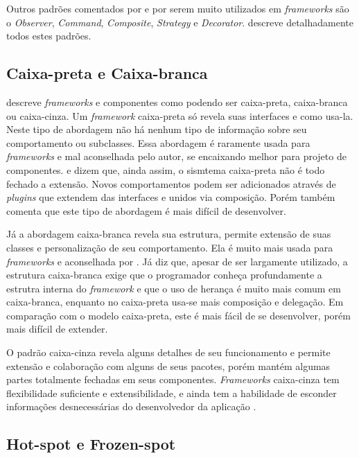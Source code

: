 Outros padrões comentados por \cite{Larman2005} e \cite{Szyperski2002} por serem muito utilizados em \textit{frameworks} são o \textit{Observer}, \textit{Command}, \textit{Composite}, \textit{Strategy} e \textit{Decorator}. \cite{Gamma1995} descreve detalhadamente todos estes padrões.

\subsection{Caixa-preta e Caixa-branca}

\cite{Szyperski2002} descreve \textit{frameworks} e componentes como podendo ser caixa-preta, caixa-branca ou caixa-cinza. Um \textit{framework} caixa-preta só revela suas interfaces e como usa-la. Neste tipo de abordagem não há nenhum tipo de informação sobre seu comportamento ou subclasses. Essa abordagem é raramente usada para \textit{frameworks} e mal aconselhada pelo autor, se encaixando melhor para projeto de componentes. \cite{Szyperski2002} e \cite{Fayad1999} dizem que, ainda assim, o sismtema caixa-preta não é todo fechado a extensão. Novos comportamentos podem ser adicionados através de \textit{plugins} que extendem das interfaces e unidos via composição. Porém \cite{Fayad1999} também comenta que este tipo de abordagem é mais difícil de desenvolver.

Já a abordagem caixa-branca revela sua estrutura, permite extensão de suas classes e personalização de seu comportamento. Ela é muito mais usada para \textit{frameworks} e aconselhada por \cite{Szyperski2002}. Já \cite{Fayad1999} diz que, apesar de ser largamente utilizado, a estrutura caixa-branca exige que o programador conheça profundamente a estrutra interna do \textit{framework} e que o uso de herança é muito mais comum em caixa-branca, enquanto no caixa-preta usa-se mais composição e delegação. Em comparação com o modelo caixa-preta, este é mais fácil de se desenvolver, porém mais difícil de extender.

O padrão caixa-cinza revela alguns detalhes de seu funcionamento e permite extensão e colaboração com alguns de seus pacotes, porém mantém algumas partes totalmente fechadas em seus componentes. \textit{Frameworks} caixa-cinza tem flexibilidade suficiente e extensibilidade, e ainda tem a habilidade de esconder informações desnecessárias do desenvolvedor da aplicação \cite{Fayad1999}.

\subsection{Hot-spot e Frozen-spot}

